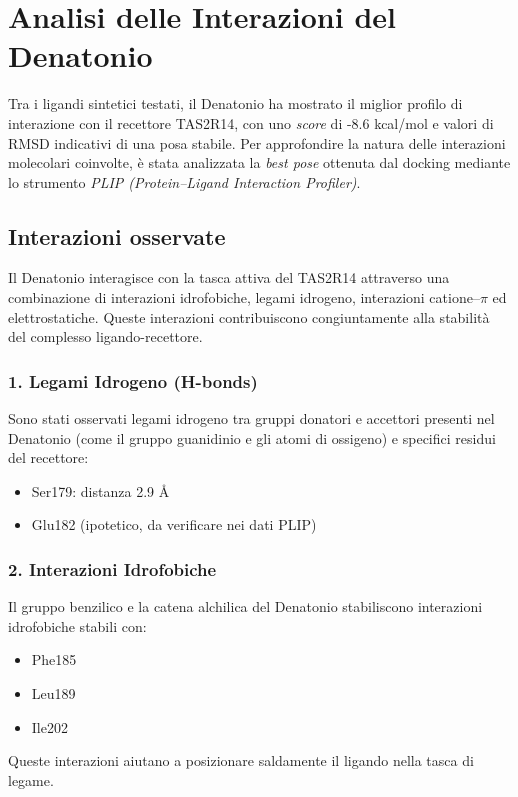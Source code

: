 \documentclass[12pt, a4paper]{book}
\begin{document}
\chapter{Analisi delle Interazioni del Denatonio}

Tra i ligandi sintetici testati, il Denatonio ha mostrato il miglior profilo di interazione con il recettore TAS2R14, con uno \textit{score} di -8.6 kcal/mol e valori di RMSD indicativi di una posa stabile. Per approfondire la natura delle interazioni molecolari coinvolte, è stata analizzata la \textit{best pose} ottenuta dal docking mediante lo strumento \textit{PLIP (Protein–Ligand Interaction Profiler)}.

\section*{Interazioni osservate}
Il Denatonio interagisce con la tasca attiva del TAS2R14 attraverso una combinazione di interazioni idrofobiche, legami idrogeno, interazioni catione–$\pi$ ed elettrostatiche. Queste interazioni contribuiscono congiuntamente alla stabilità del complesso ligando-recettore.

\subsection*{1. Legami Idrogeno (H-bonds)}
Sono stati osservati legami idrogeno tra gruppi donatori e accettori presenti nel Denatonio (come il gruppo guanidinio e gli atomi di ossigeno) e specifici residui del recettore:
\begin{itemize}
    \item Ser179: distanza 2.9 Å
    \item Glu182 (ipotetico, da verificare nei dati PLIP)
\end{itemize}

\subsection*{2. Interazioni Idrofobiche}
Il gruppo benzilico e la catena alchilica del Denatonio stabiliscono interazioni idrofobiche stabili con:
\begin{itemize}
    \item Phe185
    \item Leu189
    \item Ile202
\end{itemize}

Queste interazioni aiutano a posizionare saldamente il ligando nella tasca di legame.
\end{document}
